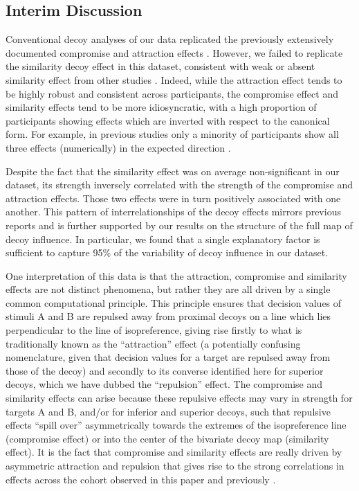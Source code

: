 \documentclass[a4paper, nobind]{templates/ociamthesis}
\begin{document}
\hypertarget{interim-discussion}{%
\subsection{Interim Discussion}\label{interim-discussion}}

Conventional decoy analyses of our data replicated the previously extensively documented compromise and attraction effects \autocite{huber1982,simonson1989}. However, we failed to replicate the similarity decoy effect in this dataset, consistent with weak or absent similarity effect from other studies \autocite{noguchi2014,berkowitsch2014}. Indeed, while the attraction effect tends to be highly robust and consistent across participants, the compromise effect and similarity effects tend to be more idiosyncratic, with a high proportion of participants showing effects which are inverted with respect to the canonical form. For example, in previous studies only a minority of participants show all three effects (numerically) in the expected direction \autocite[e.g.~only 23\% in][we find a comparable figure of 22\%]{trueblood2015}.

Despite the fact that the similarity effect was on average non-significant in our dataset, its strength inversely correlated with the strength of the compromise and attraction effects. Those two effects were in turn positively associated with one another. This pattern of interrelationships of the decoy effects mirrors previous reports \autocite{noguchi2014} and is further supported by our results on the structure of the full map of decoy influence. In particular, we found that a single explanatory factor is sufficient to capture 95\% of the variability of decoy influence in our dataset.

One interpretation of this data is that the attraction, compromise and similarity effects are not distinct phenomena, but rather they are all driven by a single common computational principle. This principle ensures that decision values of stimuli A and B are repulsed away from proximal decoys on a line which lies perpendicular to the line of isopreference, giving rise firstly to what is traditionally known as the ``attraction'' effect (a potentially confusing nomenclature, given that decision values for a target are repulsed away from those of the decoy) and secondly to its converse identified here for superior decoys, which we have dubbed the ``repulsion'' effect. The compromise and similarity effects can arise because these repulsive effects may vary in strength for targets A and B, and/or for inferior and superior decoys, such that repulsive effects ``spill over'' asymmetrically towards the extremes of the isopreference line (compromise effect) or into the center of the bivariate decoy map (similarity effect). It is the fact that compromise and similarity effects are really driven by asymmetric attraction and repulsion that gives rise to the strong correlations in effects across the cohort observed in this paper and previously \autocite{berkowitsch2014}.
\end{document}
